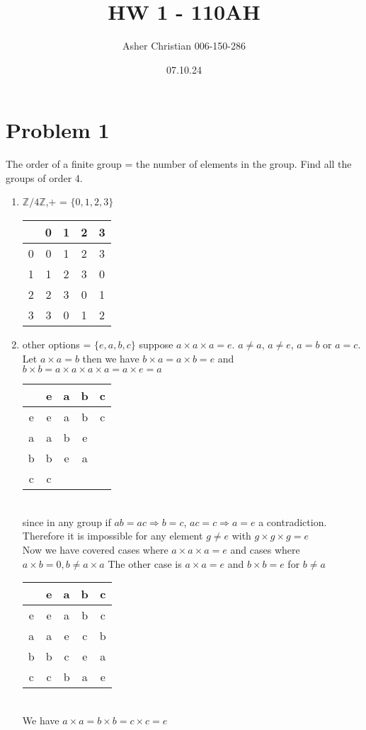 \documentclass{article}
\title{HW 1 - 110AH}
\author{Asher Christian 006-150-286}
\date{07.10.24}
\begin{document}
    \maketitle
    \section{Problem 1}
    The order of a finite group = the number of elements in the group. Find all the groups of order 4.
    \begin{enumerate}
        \item $ \mathbb{Z} / 4 \mathbb{Z}$,$+$ = $\{0,1,2,3\}$
            \begin{tabular}{c|c|c|c|c|}
                  & 0 & 1 & 2 & 3 \\ \hline
                0 & 0 & 1 & 2 & 3 \\ \hline
                1 & 1 & 2 & 3 & 0 \\ \hline
                2 & 2 & 3 & 0 & 1 \\ \hline
                3 & 3 & 0 & 1 & 2 \\ \hline
            \end{tabular}
        \item other options = $\{e,a,b,c\}$
            suppose $a \times a \times a = e$. $a \ne a$,  $a \ne e$,  $a = b$ or $a = c$.
            Let $a\times a = b$ then we have  $b\times a = a\times b = e$ and $b\times b = a\times a \times a \times a = a \times e = a$
            \begin{tabular}{c|c|c|c|c|}
                  & e & a & b & c \\ \hline
                e & e & a & b & c \\ \hline
                a & a & b & e &   \\ \hline
                b & b & e & a &   \\ \hline
                c & c &   &   &   \\ \hline
            \end{tabular}\\
            since in any group if $ab = ac \Rightarrow b = c$,  $ac = c \Rightarrow a = e$ a contradiction. Therefore
            it is impossible for any element $g \ne e$ with $g \times g \times g = e$ \\
            Now we have covered cases where $a\times a \times a = e$ and cases where  $a\times b = 0, b \ne a\times a$ 
            The other case is  $a\times a = e$ and $b\times b = e$ for $b \ne a$ \\
            \begin{tabular}{c|c|c|c|c|}
                  & e & a & b & c \\ \hline
                e & e & a & b & c \\ \hline
                a & a & e & c & b \\ \hline
                b & b & c & e & a \\ \hline
                c & c & b & a & e \\ \hline
            \end{tabular}\\    We have $a\times a = b\times b = c\times c = e$
        

\end{enumerate}
\end{document}
